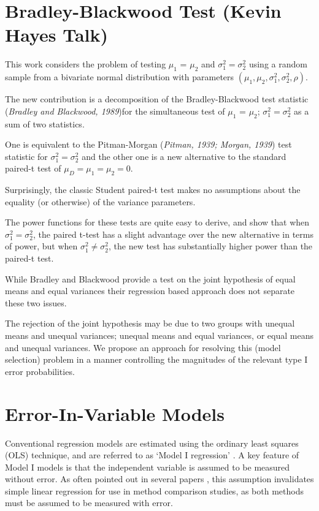 \documentclass[12pt, a4paper]{report}
\theoremstyle{plain}
\theoremstyle{definition}
\theoremstyle{remark}
\begin{document}
	

	\section{Bradley-Blackwood Test (Kevin Hayes Talk)}
	
	This work considers the problem of testing $\mu_1$ = $\mu_2$ and $\sigma^2_1 = \sigma^2_2$ using a random sample from a bivariate normal distribution with parameters $(\mu_1, \mu_2, \sigma^2_1, \sigma^2_2, \rho)$. 
	
	The new contribution is a decomposition of the Bradley-Blackwood test statistic (\textit{Bradley and Blackwood, 1989})for the simultaneous test of {$\mu_1$ = $\mu_2$; $\sigma^2_1 = \sigma^2_2$}  as a sum of two statistics. 
	
	One is equivalent to the Pitman-Morgan (\textit{Pitman, 1939; Morgan, 1939}) test statistic 
	for $\sigma^2_1 = \sigma^2_2$ and the other one is a new alternative to the standard paired-t test of $\mu_D = \mu_1 = \mu_2 = 0$. 
	
	Surprisingly, the classic Student paired-t test makes no assumptions about the equality (or otherwise) of the 
	variance parameters. 
	
	The power functions for these tests are quite easy to derive, and show that when $\sigma^2_1 = \sigma^2_2$, 
	the paired t-test has a slight advantage over the new alternative in terms of power, but when $\sigma^2_1 \neq \sigma^2_2$, the 
	new test has substantially higher power than the paired-t test.
	
	While Bradley and Blackwood provide a test on the joint hypothesis of equal means and equal variances their regression based approach does not separate these two issues.
	
	The rejection of the joint hypothesis may be 
	due to two groups with unequal means and unequal variances; unequal means and equal variances, or equal means and unequal variances. We propose an approach for resolving this (model selection) problem in a manner controlling the magnitudes of the relevant type I error probabilities.
	
	
	

\section{Error-In-Variable Models}
Conventional regression models are estimated using the ordinary
least squares (OLS) technique, and are referred to as `Model I
regression' \citep{CornCoch,ludbrook97}. A key feature of Model I
models is that the independent variable is assumed to be measured
without error. As often pointed out in several papers
\citep{BA83,ludbrook97}, this assumption invalidates simple linear
regression for use in method comparison studies, as both methods
must be assumed to be measured with error.
\end{document}
